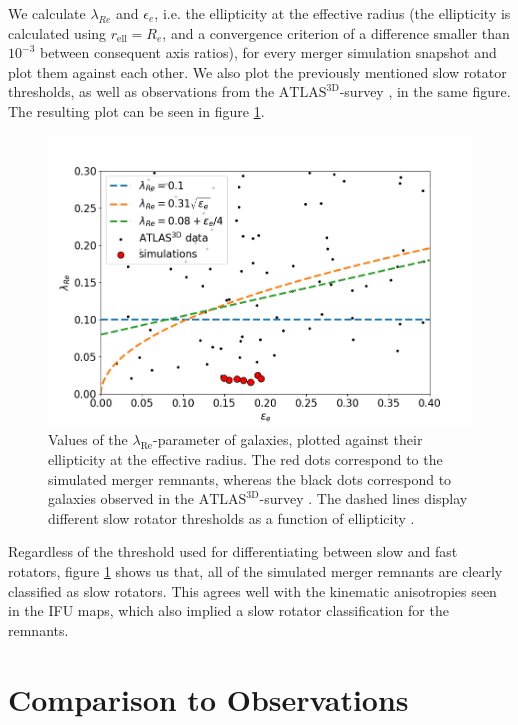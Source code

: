 \documentclass[english, oneside]{HYgradu}
\begin{document}
We calculate $\lambda_{Re}$ and $\epsilon_e$, i.e. the ellipticity at the effective radius (the ellipticity is calculated using $r_\mathrm{ell} = R_e$, and a convergence criterion of a difference smaller than $10^{-3}$ between consequent axis ratios), for every merger simulation snapshot and plot them against each other. We also plot the previously mentioned slow rotator thresholds, as well as observations from the $\mathrm{ATLAS^{3D}}$-survey \citep{Cappellari2011}, in the same figure. The resulting plot can be seen in figure \ref{figure:lambda_epsilon}. 

\begin{figure}[h]
	\centering
	\includegraphics[width=\textwidth]{lambda_epsilon.png}
	\caption{Values of the $\lambda_{\mathrm{Re}}$-parameter of galaxies, plotted against their ellipticity at the effective radius. The red dots correspond to the simulated merger remnants, whereas the black dots correspond to galaxies observed in the $\mathrm{ATLAS^{3D}}$-survey \citep{Cappellari2011, Emsellem2011}. The dashed lines display different slow rotator thresholds as a function of ellipticity \citep{Emsellem2007, Emsellem2011, Cappellari2016}.}
	\label{figure:lambda_epsilon}
\end{figure}

Regardless of the threshold used for differentiating between slow and fast rotators, figure \ref{figure:lambda_epsilon} shows us that, all of the simulated merger remnants are clearly classified as slow rotators. This agrees well with the kinematic anisotropies seen in the IFU maps, which also implied a slow rotator classification for the remnants.

\section{Comparison to Observations}
\end{document}
